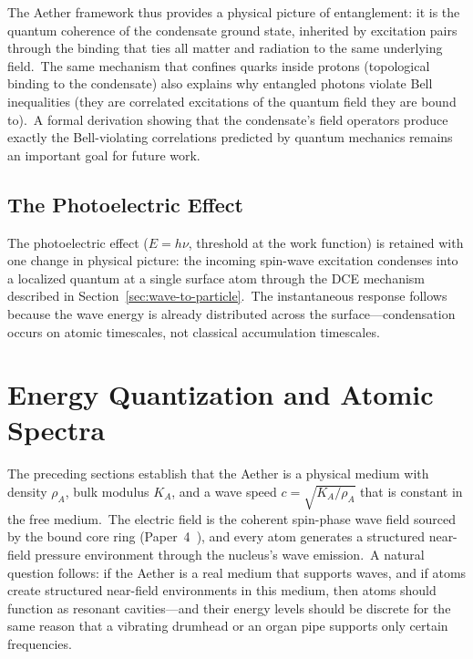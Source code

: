 ﻿\documentclass[12pt,letterpaper]{article}
\newcommand{\rhoa}{\rho_{\!A}}
\newcommand{\Ka}{K_{\!A}}
\begin{document}
The Aether framework thus provides a physical picture of entanglement: it is the
quantum coherence of the condensate ground state, inherited by excitation pairs
through the binding that ties all matter and radiation to the same underlying
field.\ The same mechanism that confines quarks inside protons (topological binding
to the condensate) also explains why entangled photons violate Bell inequalities
(they are correlated excitations of the quantum field they are bound to).\ A formal
derivation showing that the condensate's field operators produce exactly the
Bell-violating correlations predicted by quantum mechanics remains an important
goal for future work.


\subsection{The Photoelectric Effect}

The photoelectric effect ($E = h\nu$, threshold at the work function) is
retained with one change in physical picture: the incoming spin-wave
excitation condenses into a localized quantum at a single surface atom
through the DCE mechanism described in Section~\ref{sec:wave-to-particle}.\ The instantaneous
response follows because the wave energy is already distributed across
the surface---condensation occurs on atomic timescales, not classical
accumulation timescales.



\section{Energy Quantization and Atomic Spectra}

The preceding sections establish that the Aether is a physical medium with density
$\rhoa$, bulk modulus $\Ka$, and a wave speed $c = \sqrt{\Ka/\rhoa}$ that is constant
in the free medium.\ The electric field is the coherent spin-phase wave field
sourced by the bound core ring (Paper~4~\cite{otto-em}), and every atom generates a structured
near-field pressure environment through the nucleus's wave emission.\ A natural
question follows: if the Aether is a real medium that supports waves, and if atoms
create structured near-field environments in this medium, then atoms should function
as resonant cavities---and their energy levels should be discrete for the same reason
that a vibrating drumhead or an organ pipe supports only certain frequencies.
\end{document}
